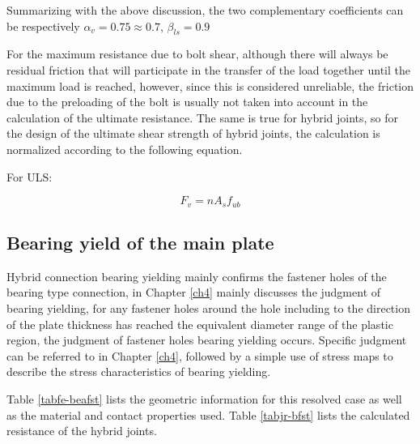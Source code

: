 Summarizing with the above discussion, the two complementary coefficients can be respectively $\alpha_v = 0.75 \approx 0.7$, $\beta_{ls} = 0.9$

For the maximum resistance due to bolt shear, although there will always be residual friction that will participate in the transfer of the load together until the maximum load is reached, however, since this is considered unreliable, the friction due to the preloading of the bolt is usually not taken into account in the calculation of the ultimate resistance. The same is true for hybrid joints, so for the design of the ultimate shear strength of hybrid joints, the calculation is normalized according to the following equation.

For ULS:

\begin{equation}
    F_v = n A_s f_{ub}
\end{equation}

\subsection{Bearing yield of the main plate}

Hybrid connection bearing yielding mainly confirms the fastener holes of the bearing type connection, in Chapter \ref{ch4} mainly discusses the judgment of bearing yielding, for any fastener holes around the hole including to the direction of the plate thickness has reached the equivalent diameter range of the plastic region, the judgment of fastener holes bearing yielding occurs. Specific judgment can be referred to in Chapter \ref{ch4}, followed by a simple use of stress maps to describe the stress characteristics of bearing yielding.

Table \ref{tabfe-beafst} lists the geometric information for this resolved case as well as the material and contact properties used. Table \ref{tabjr-bfst} lists the calculated resistance of the hybrid joints.

